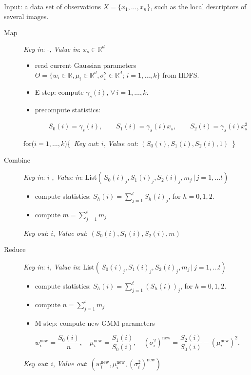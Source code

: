 \documentclass[a4paper,10pt]{article}
\begin{document}
Input: a data set of observations $X=\{x_1, \dots, x_n\}$, such as the local descriptors of several images.
\begin{description}
	
	\item[{Map}]
	\textit{Key in}: -, \textit{Value in}: $ x_s\in \mathbb{R}^d$ 
	\begin{itemize}
		\item read current Gaussian parameters $\Theta=\{w_i \in \mathbb{R}, \mu_{i}\in\mathbb{R}^d, \sigma_i^2 \in \mathbb{R}^{d};\, i=1,\dots, k\}$ from HDFS.
		\item E-step: compute 	$\gamma_s(i)$, $\forall\, i=1,\dots,k$.
		\item precompute statistics:
		
		$
		\qquad S_0(i)=\gamma_s(i),  \qquad
		S_1(i) =\gamma_s(i) x_s, \qquad
		S_2 (i) = \gamma_s(i)  x_s^2 
		$
		
	\end{itemize}
	for($i=1,\dots, k$)\{$\,$ \textit{Key out}:  $i$, \textit{Value out}: $(S_0(i),S_1(i),S_2(i), 1)$\,	\}
	
	\item[Combine] 
	\textit{Key in}: $i$ , \textit{Value in}: List$\left(\, S_0(i)_j,S_1(i)_j,S_2(i)_j, m_j\, | \,j=1,\dots t\right)$
	\begin{itemize}
		\item compute statistics:	
		$S_h(i)=\sum_{j=1}^{t} S_h(i)_j$,  for $h=0,1,2$.
		\item compute $m=\sum_{j=1}^{t} m_j$
			\end{itemize}
		\textit{Key out}:  $i$, \textit{Value out}: $(S_0(i),S_1(i),S_2(i), m)$\,
	\item[Reduce] 
	\textit{Key in}: $i$, \textit{Value in}: List$\left(\, S_0(i)_j,S_1(i)_j,S_2(i)_j, m_j\, | \,j=1,\dots t\right)$
	\begin{itemize}
		\item compute statistics:	
		$S_h(i)=\sum_{j=1}^{t} (S_h(i))_j$,  for $h=0,1,2$.
		\item compute $n=\sum_{j=1}^{t} m_j$
		\item M-step: compute new GMM parameters
		
		$
		w_i^{\text{new}}=\dfrac{S_0(i)}{n}, \quad 
		\mu_i^{\text{new}}=\dfrac{S_1(i)}{S_0(i)},\quad  
		(\sigma^2_i)^{\text{new}}=%
		\dfrac{S_2(i)}{S_0(i)}-(\mu_i^{\text{new}})^2.
		$
		
		
	\end{itemize}
	
	\textit{Key out}:  $i$, 	\textit{Value out}: $(w_i^{\text{new}},	\mu_i^{\text{new}},	(\sigma^2_i)^{\text{new}})$\\
\end{description}
\end{document}
